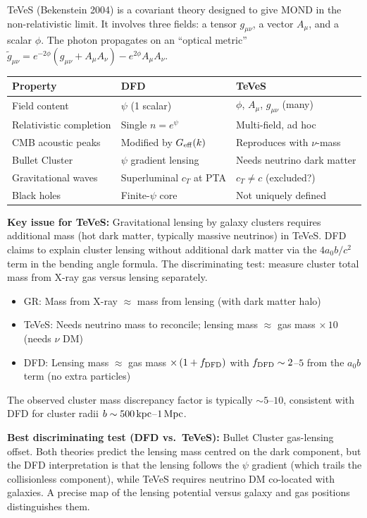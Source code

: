 \documentclass[11pt]{article}
\newcommand{\azero}{a_0}
\begin{document}
TeVeS (Bekenstein 2004) is a covariant theory designed to give MOND in
the non-relativistic limit.  It involves three fields: a tensor $g_{\mu\nu}$,
a vector $A_\mu$, and a scalar $\phi$.  The photon propagates on an
``optical metric'' $\tilde g_{\mu\nu} = e^{-2\phi}(g_{\mu\nu} + A_\mu A_\nu)
- e^{2\phi}A_\mu A_\nu$.

\begin{center}
\begin{tabular}{lll}
\toprule
Property & DFD & TeVeS \\
\midrule
Field content & $\psi$ (1 scalar) & $\phi$, $A_\mu$, $g_{\mu\nu}$ (many) \\
Relativistic completion & Single $n = e^\psi$ & Multi-field, ad hoc \\
CMB acoustic peaks & Modified by $G_{\rm eff}(k)$ & Reproduces with $\nu$-mass \\
Bullet Cluster & $\psi$ gradient lensing & Needs neutrino dark matter \\
Gravitational waves & Superluminal $c_T$ at PTA & $c_T \neq c$ (excluded?) \\
Black holes & Finite-$\psi$ core & Not uniquely defined \\
\bottomrule
\end{tabular}
\end{center}

\textbf{Key issue for TeVeS:} Gravitational lensing by galaxy clusters
requires additional mass (hot dark matter, typically massive neutrinos) in
TeVeS.  DFD claims to explain cluster lensing without additional dark matter
via the $4\azero b/c^2$ term in the bending angle formula.  The discriminating
test: measure cluster total mass from X-ray gas versus lensing separately.
\begin{itemize}[nosep]
  \item GR: Mass from X-ray $\approx$ mass from lensing (with dark matter halo)
  \item TeVeS: Needs neutrino mass to reconcile; lensing mass $\approx$
    gas mass $\times\,10$ (needs $\nu$ DM)
  \item DFD: Lensing mass $\approx$ gas mass $\times\,(1 + f_{\rm DFD})$
    with $f_{\rm DFD} \sim 2$--$5$ from the $\azero b$ term (no extra particles)
\end{itemize}

The observed cluster mass discrepancy factor is typically $\sim 5$--$10$,
consistent with DFD for cluster radii $b \sim 500\,{\rm kpc}$--$1\,{\rm Mpc}$.

\textbf{Best discriminating test (DFD vs.\ TeVeS):} Bullet Cluster gas-lensing
offset.  Both theories predict the lensing mass centred on the dark
component, but the DFD interpretation is that the lensing follows the
$\psi$ gradient (which trails the collisionless component), while TeVeS
requires neutrino DM co-located with galaxies.  A precise map of the
lensing potential versus galaxy and gas positions distinguishes them.
\end{document}
